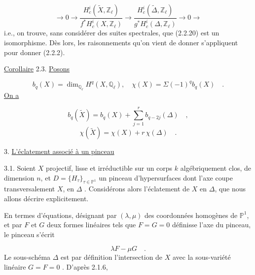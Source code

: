 \begin{equation}\tag{2.2.27}
\longrightarrow 0 \longrightarrow \frac{H^i_c(\widetilde{X},\mathbb{Z}_\ell)}{f^*H^i_c(X,\mathbb{Z}_\ell)} \longrightarrow \frac{H^i_c(\widetilde{\Delta},\mathbb{Z}_\ell)}{g^*H^i_c(\Delta,\mathbb{Z}_\ell)} \longrightarrow 0 \longrightarrow
\end{equation}
i.e., on trouve, sans considérer des suites spectrales, que (2.2.20) est un isomorphisme. Dès lors, les raisonnements qu'on vient de donner s'appliquent pour donner (2.2.2).

\underline{Corollaire} 2.3.  \underline{Posons}

\begin{equation*}
b_q(X) = \dim_{\mathbb{Q}_\ell} H^q(X,\mathbb{Q}_\ell), \quad \chi(X) = \Sigma(-1)^q b_q(X) \quad .
\end{equation*}
\underline{On a}

\begin{equation}\tag{2.3.1}
b_q(\widetilde{X}) = b_q(X) + \sum_{j=1}^{r} b_{q-2j}(\Delta) \quad ,
\end{equation}
\begin{equation}\tag{2.3.2}
\chi(\widetilde{X}) = \chi(X) + r\,\chi(\Delta) \quad .
\end{equation}



3. \underline{L'éclatement associé à un pinceau}

3.1.  Soient $X$ projectif, lisse et irréductible sur un corps $k$ algébriquement clos, de dimension $n$, et $D = \{H_\tau\}_{\tau \in \mathbb{P}^1}$ un pinceau d'hypersurfaces dont l'axe coupe transversalement $X$, en $\Delta$ . Considérons alors l'éclatement de $X$ en $\Delta$, que nous allons décrire explicitement.

En termes d'équations, désignant par $(\lambda,\mu)$ des coordonnées homogènes de $\mathbb{P}^1$, et par $F$ et $G$ deux formes linéaires tels que $F = G = 0$ définisse l'axe du pinceau, le pinceau s'écrit

\begin{equation}\tag{3.1.1}
\lambda F - \mu G \quad .
\end{equation}
Le sous-schéma $\Delta$ est par définition l'intersection de $X$ avec la sous-variété linéaire $G = F = 0$ . D'après 2.1.6,

